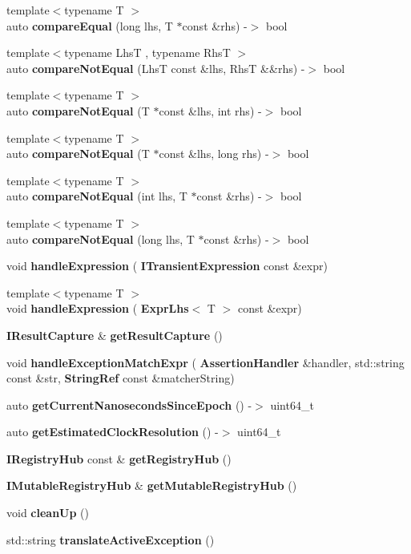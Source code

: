 \begin{DoxyCompactItemize}
{\footnotesize template$<$typename T $>$ }\\auto \textbf{ compare\+Equal} (long lhs, T $\ast$const \&rhs) -\/$>$ bool
\item 
{\footnotesize template$<$typename LhsT , typename RhsT $>$ }\\auto \textbf{ compare\+Not\+Equal} (LhsT const \&lhs, RhsT \&\&rhs) -\/$>$ bool
\item 
{\footnotesize template$<$typename T $>$ }\\auto \textbf{ compare\+Not\+Equal} (T $\ast$const \&lhs, int rhs) -\/$>$ bool
\item 
{\footnotesize template$<$typename T $>$ }\\auto \textbf{ compare\+Not\+Equal} (T $\ast$const \&lhs, long rhs) -\/$>$ bool
\item 
{\footnotesize template$<$typename T $>$ }\\auto \textbf{ compare\+Not\+Equal} (int lhs, T $\ast$const \&rhs) -\/$>$ bool
\item 
{\footnotesize template$<$typename T $>$ }\\auto \textbf{ compare\+Not\+Equal} (long lhs, T $\ast$const \&rhs) -\/$>$ bool
\item 
void \textbf{ handle\+Expression} (\textbf{ I\+Transient\+Expression} const \&expr)
\item 
{\footnotesize template$<$typename T $>$ }\\void \textbf{ handle\+Expression} (\textbf{ Expr\+Lhs}$<$ T $>$ const \&expr)
\item 
\textbf{ I\+Result\+Capture} \& \textbf{ get\+Result\+Capture} ()
\item 
void \textbf{ handle\+Exception\+Match\+Expr} (\textbf{ Assertion\+Handler} \&handler, std\+::string const \&str, \textbf{ String\+Ref} const \&matcher\+String)
\item 
auto \textbf{ get\+Current\+Nanoseconds\+Since\+Epoch} () -\/$>$ uint64\+\_\+t
\item 
auto \textbf{ get\+Estimated\+Clock\+Resolution} () -\/$>$ uint64\+\_\+t
\item 
\textbf{ I\+Registry\+Hub} const  \& \textbf{ get\+Registry\+Hub} ()
\item 
\textbf{ I\+Mutable\+Registry\+Hub} \& \textbf{ get\+Mutable\+Registry\+Hub} ()
\item 
void \textbf{ clean\+Up} ()
\item 
std\+::string \textbf{ translate\+Active\+Exception} ()
\item 

\end{DoxyCompactItemize}

